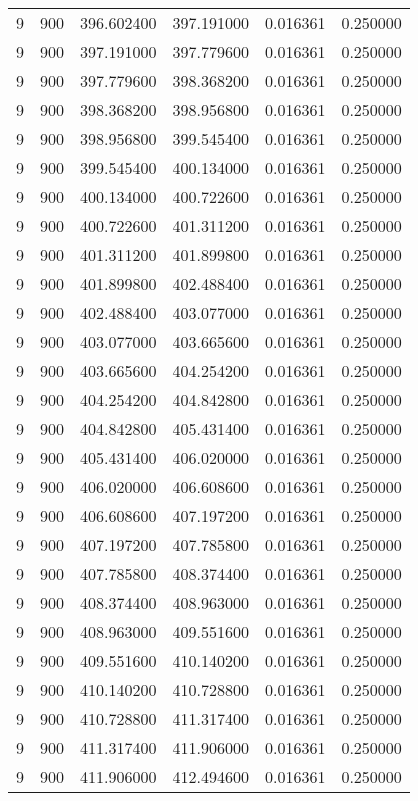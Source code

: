 \begin{longtable}{rrrrrr}
9 & 900 & 396.602400 & 397.191000 & 0.016361 & 0.250000 \\
9 & 900 & 397.191000 & 397.779600 & 0.016361 & 0.250000 \\
9 & 900 & 397.779600 & 398.368200 & 0.016361 & 0.250000 \\
9 & 900 & 398.368200 & 398.956800 & 0.016361 & 0.250000 \\
9 & 900 & 398.956800 & 399.545400 & 0.016361 & 0.250000 \\
9 & 900 & 399.545400 & 400.134000 & 0.016361 & 0.250000 \\
9 & 900 & 400.134000 & 400.722600 & 0.016361 & 0.250000 \\
9 & 900 & 400.722600 & 401.311200 & 0.016361 & 0.250000 \\
9 & 900 & 401.311200 & 401.899800 & 0.016361 & 0.250000 \\
9 & 900 & 401.899800 & 402.488400 & 0.016361 & 0.250000 \\
9 & 900 & 402.488400 & 403.077000 & 0.016361 & 0.250000 \\
9 & 900 & 403.077000 & 403.665600 & 0.016361 & 0.250000 \\
9 & 900 & 403.665600 & 404.254200 & 0.016361 & 0.250000 \\
9 & 900 & 404.254200 & 404.842800 & 0.016361 & 0.250000 \\
9 & 900 & 404.842800 & 405.431400 & 0.016361 & 0.250000 \\
9 & 900 & 405.431400 & 406.020000 & 0.016361 & 0.250000 \\
9 & 900 & 406.020000 & 406.608600 & 0.016361 & 0.250000 \\
9 & 900 & 406.608600 & 407.197200 & 0.016361 & 0.250000 \\
9 & 900 & 407.197200 & 407.785800 & 0.016361 & 0.250000 \\
9 & 900 & 407.785800 & 408.374400 & 0.016361 & 0.250000 \\
9 & 900 & 408.374400 & 408.963000 & 0.016361 & 0.250000 \\
9 & 900 & 408.963000 & 409.551600 & 0.016361 & 0.250000 \\
9 & 900 & 409.551600 & 410.140200 & 0.016361 & 0.250000 \\
9 & 900 & 410.140200 & 410.728800 & 0.016361 & 0.250000 \\
9 & 900 & 410.728800 & 411.317400 & 0.016361 & 0.250000 \\
9 & 900 & 411.317400 & 411.906000 & 0.016361 & 0.250000 \\
9 & 900 & 411.906000 & 412.494600 & 0.016361 & 0.250000 \\

\end{longtable}
